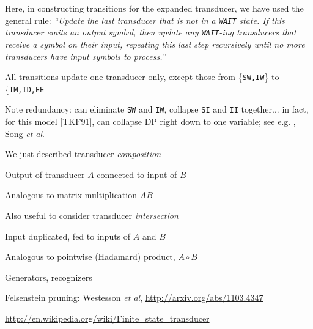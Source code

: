 \documentclass{beamer}
\begin{document}
\begin{frame}{}
 Here, in constructing transitions for the expanded transducer, we have used the general rule:
{\em``Update the last transducer that is not in a {\tt WAIT} state. If this transducer emits an output symbol,
 then update any {\tt WAIT}-ing transducers that receive a symbol on their input,
 repeating this last step recursively until no more transducers have input symbols to process.''}

All transitions update one transducer only, except those from \{{\tt SW,IW}\} to \{{\tt IM,ID,EE}

Note redundancy: can eliminate {\tt SW} and {\tt IW}, collapse {\tt SI} and {\tt II} together...
in fact, for this model [TKF91], can collapse DP right down to one variable; see e.g. \Miklos, Song {\em et al}.
\end{frame}

\begin{frame}{}
\itemb
\item We just described transducer {\em composition}
 \itemb
 \item Output of transducer $A$ connected to input of $B$
 \item Analogous to matrix multiplication $AB$
 \iteme
\item Also useful to consider transducer {\em intersection}
 \itemb
 \item Input duplicated, fed to inputs of $A$ and $B$
 \item Analogous to pointwise (Hadamard) product, $A \circ B$
 \iteme
\item Generators, recognizers
\item Felsenstein pruning: Westesson {\em et al}, \url{http://arxiv.org/abs/1103.4347}
\iteme
\small
\centerline{ \url{http://en.wikipedia.org/wiki/Finite_state_transducer} }
\normalsize
\end{frame}
\end{document}

